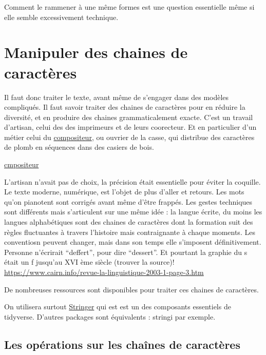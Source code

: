 \documentclass[
]{book}
\begin{document}
Comment le rammener à une même formes est une question essentielle même si elle semble excessivement technique.

\hypertarget{manipuler-des-chaines-de-caractuxe8res}{%
\section{Manipuler des chaines de caractères}\label{manipuler-des-chaines-de-caractuxe8res}}

Il faut donc traiter le texte, avant même de s'engager dans des modèles compliqués. Il faut savoir traiter des chaines de caractères pour en réduire la diversité, et en produire des chaines grammaticalement exacte. C'est un travail d'artisan, celui des des imprimeurs et de leurs coorecteur. Et en particulier d'un métier celui du \href{http://www.textesrares.com/dupon/d376.htm}{compositeur}, ou ouvrier de la casse, qui distribue des caractères de plomb en séquences dans des casiers de bois.

\href{\%22./data/compositeur.jpg\%22}{cmpositeur}

L'artisan n'avait pas de choix, la précision était essentielle pour éviter la coquille. Le texte moderne, numérique, est l'objet de plus d'aller et retours. Les mots qu'on pianotent sont corrigés avant même d'être frappés. Les gestes techniques sont différents mais s'articulent sur une même idée : la langue écrite, du moins les langues alphabétiques sont des chaines de caractères dont la formation suit des règles fluctuantes à travers l'histoire mais contraignante à chaque moments. Les conventiosn peuvent changer, mais dans son temps elle s'imposent définitivement. Personne n'écrirait ``deffert'', pour dire ``dessert''. Et pourtant la graphie du s était un f jusqu'au XVI ème siècle (trouver la source)!
\url{https://www.cairn.info/revue-la-linguistique-2003-1-page-3.htm}

De nombreuses ressources sont disponibles pour traiter ces chaines de caractères.

On utilisera surtout \href{https://stringr.tidyverse.org/}{Stringer} qui est est un des composants essentiels de tidyverse. D'autres packages sont équivalents : stringi par exemple.

\hypertarget{les-opuxe9rations-sur-les-chauxeenes-de-caractuxe8res}{%
\subsection{Les opérations sur les chaînes de caractères}\label{les-opuxe9rations-sur-les-chauxeenes-de-caractuxe8res}}
\end{document}
